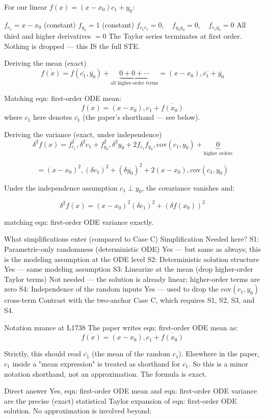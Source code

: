 \documentclass[twoside]{article}
\numberwithin{equation}{section}
\begin{document}
For our linear $f(x) = (x - x_0) c_1 + y_0$:

$f_{c_1} = x - x_0$ (constant)
$f_{y_0} = 1$ (constant)
$f_{c_1 c_1} = 0, \quad f_{y_0 y_0} = 0, \quad f_{c_1 y_0} = 0$
All third and higher derivatives $= 0$
The Taylor series terminates at first order. Nothing is dropped — this IS the full STE.

Deriving the mean (exact)
$$\overline{f(x)} = f(\overline{c_1}, \overline{y_0}) + \underbrace{0 + 0 + \cdots}_{\text{all higher-order terms}} = (x - x_0), \overline{c_1} + \overline{y_0}$$

Matching eqn: first-order ODE mean:
$$\overline{f(x)} = (x - x_0), c_1 + \overline{f(x_0)}$$
where $c_1$ here denotes $\overline{c_1}$ (the paper's shorthand — see below).

Deriving the variance (exact, under independence)
$$\delta^2 f(x) = f_{c_1}^2, \delta^2 c_1 + f_{y_0}^2, \delta^2 y_0 + 2 f_{c_1} f_{y_0}, \text{cov}(c_1, y_0) + \underbrace{0}_{\text{higher orders}}$$

$$= (x - x_0)^2, (\delta c_1)^2 + (\delta y_0)^2 + 2(x - x_0), \text{cov}(c_1, y_0)$$

Under the independence assumption $c_1 \perp y_0$, the covariance vanishes and:

$$\delta^2 f(x) = (x - x_0)^2 (\delta c_1)^2 + (\delta f(x_0))^2$$

matching eqn: first-order ODE variance exactly.

What simplifications enter (compared to Case C)
Simplification	Needed here?
S1: Parametric-only randomness (deterministic ODE)	Yes — but same as always; this is the modeling assumption at the ODE level
S2: Deterministic solution structure	Yes — same modeling assumption
S3: Linearize at the mean (drop higher-order Taylor terms)	Not needed — the solution is already linear; higher-order terms are zero
S4: Independence of the random inputs	Yes — used to drop the $\text{cov}(c_1, y_0)$ cross-term
Contrast with the two-anchor Case C, which requires S1, S2, S3, and S4.

Notation nuance at L1738
The paper writes eqn: first-order ODE mean as:
$$\overline{f(x)} = (x - x_0), c_1 + \overline{f(x_0)}$$

Strictly, this should read $\overline{c_1}$ (the mean of the random $c_1$). Elsewhere in the paper, $c_1$ inside a "mean expression" is treated as shorthand for $\overline{c_1}$. So this is a minor notation shorthand, not an approximation. The formula is exact.

Direct answer
Yes, eqn: first-order ODE mean and eqn: first-order ODE variance are the precise (exact) statistical Taylor expansion of eqn: first-order ODE solution. No approximation is involved beyond:
\end{document}
